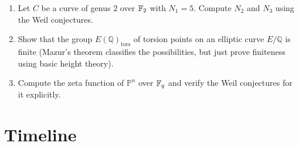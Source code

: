 \begin{enumerate}
\[    \]
    where $\hat{f}$ is the Fourier transform.
    \item [I] Let $C$ be a curve of genus $2$ over $\mathbb{F}_2$ with $N_1 = 5$. Compute $N_2$ and $N_3$ using the Weil conjectures.
    \item [A] Show that the group $E(\mathbb{Q})_{\text{tors}}$ of torsion points on an elliptic curve $E/\mathbb{Q}$ is finite (Mazur's theorem classifies the possibilities, but just prove finiteness using basic height theory).
    \item [I] Compute the zeta function of $\mathbb{P}^n$ over $\mathbb{F}_q$ and verify the Weil conjectures for it explicitly.
\end{enumerate}

\section*{Timeline}

